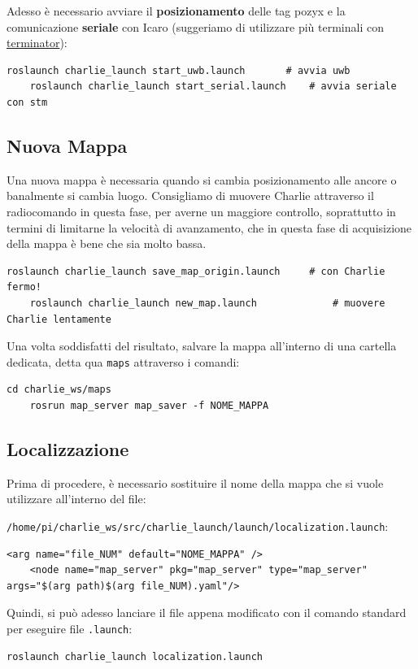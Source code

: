 Adesso è necessario avviare il \textbf{posizionamento} delle tag pozyx e la comunicazione \textbf{seriale} con Icaro (suggeriamo di utilizzare più terminali con \href{https://terminator-gtk3.readthedocs.io/en/latest/}{terminator}):
\begin{lstlisting}[style=bash]
	roslaunch charlie_launch start_uwb.launch		# avvia uwb
	roslaunch charlie_launch start_serial.launch	# avvia seriale con stm
\end{lstlisting}

\subsection*{Nuova Mappa}
Una nuova mappa è necessaria quando si cambia posizionamento alle ancore o banalmente si cambia luogo. Consigliamo di muovere Charlie attraverso il radiocomando in questa fase, per averne un maggiore controllo, soprattutto in termini di limitarne la velocità di avanzamento, che in questa fase di acquisizione della mappa è bene che sia molto bassa.
\begin{lstlisting}[style=bash]
	roslaunch charlie_launch save_map_origin.launch		# con Charlie fermo!
	roslaunch charlie_launch new_map.launch 			# muovere Charlie lentamente
\end{lstlisting}

Una volta soddisfatti del risultato, salvare la mappa all'interno di una cartella dedicata, detta qua \verb|maps| attraverso i comandi:
\begin{lstlisting}[style=bash]
	cd charlie_ws/maps
	rosrun map_server map_saver -f NOME_MAPPA
\end{lstlisting}

\subsection*{Localizzazione}
Prima di procedere, è necessario sostituire il nome della mappa che si vuole utilizzare all'interno del file:

\verb|/home/pi/charlie_ws/src/charlie_launch/launch/localization.launch|:

\begin{lstlisting}[style=xml, firstnumber=14]
	<arg name="file_NUM" default="NOME_MAPPA" />
	<node name="map_server" pkg="map_server" type="map_server" args="$(arg path)$(arg file_NUM).yaml"/>
\end{lstlisting}

Quindi, si può adesso lanciare il file appena modificato con il comando standard per eseguire file \verb|.launch|:
\begin{lstlisting}[style=bash]
	roslaunch charlie_launch localization.launch
\end{lstlisting}

